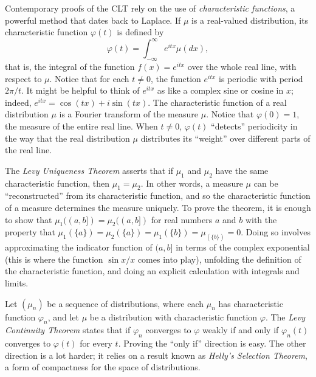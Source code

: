 \documentclass{article}
\newcommand{\ph}{\varphi}
\begin{document}
Contemporary proofs of the CLT rely on the use of \emph{characteristic functions}, a powerful method that dates back to Laplace. If $\mu$ is a real-valued distribution, its characteristic function $\ph(t)$ is defined by
\[
\ph(t) = \int_{-\infty}^{\infty} e^{itx} \mu(dx),
\]
that is, the integral of the function $f(x) = e^{itx}$ over the whole real line, with respect to $\mu$. Notice that for each $t \neq 0$, the function $e^{itx}$ is periodic with period $2 \pi / t$. It might be helpful to think of $e^{itx}$ as like a complex sine or cosine in $x$; indeed, $e^{itx}= \cos (t x) + i \sin (t x)$. 
The characteristic function of a real distribution $\mu$ is a Fourier transform of the measure $\mu$. Notice that $\ph(0) = 1$, the measure of the entire real line. When $t \neq 0$, $\ph(t)$ ``detects'' periodicity in the way that the real distribution $\mu$ distributes its ``weight'' over different parts of the real line. 

The \emph{Levy Uniqueness Theorem} asserts that if $\mu_1$ and $\mu_2$ have the same characteristic function, then $\mu_1 = \mu_2$. In other words, a measure $\mu$ can be ``reconstructed'' from its characteristic function, and so the characteristic function of a measure determines the measure uniquely. To prove the theorem, it is enough to show that $\mu_1((a,b]) = \mu_2((a,b])$ for real numbers $a$ and $b$ with the property that $\mu_1(\{a\}) = \mu_2(\{a\}) = \mu_1(\{b\}) = \mu_(\{b\}) = 0$. Doing so involves approximating the indicator function of $(a,b]$ in terms of the complex exponential (this is where the function $\sin x / x$ comes into play), unfolding the definition of the characteristic function, and doing an explicit calculation with integrals and limits.

Let $(\mu_n)$ be a sequence of distributions, where each $\mu_n$ has characteristic function $\ph_n$, and let $\mu$ be a distribution with characteristic function $\ph$. The \emph{Levy Continuity Theorem} states that if $\ph_n$ converges to $\ph$ weakly if and only if $\ph_n(t)$ converges to $\ph(t)$ for every $t$. Proving the ``only if'' direction is easy. The other direction is a lot harder; it relies on a result known as \emph{Helly's Selection Theorem}, a form of compactness for the space of distributions.
\end{document}
